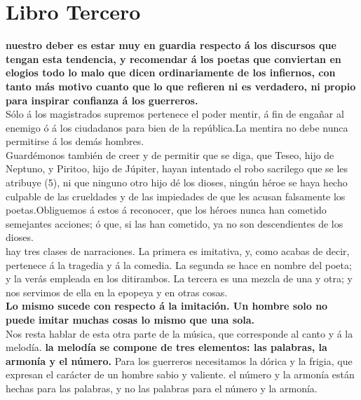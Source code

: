 \documentclass[10pt]{book}
\begin{document}
\chapter*{Libro Tercero}
\textbf{nuestro deber es estar muy en guardia respecto á los discursos que tengan esta tendencia, y recomendar á los poetas que conviertan en elogios todo lo malo que dicen ordinariamente de los infiernos, con tanto más motivo cuanto que lo que refieren ni es verdadero, ni propio para inspirar confianza á los guerreros.}\\
Sólo á los magistrados supremos pertenece el poder mentir, á fin de engañar al enemigo ó á los ciudadanos para bien de la república.La mentira no debe nunca permitirse á los demás hombres.\\
Guardémonos también de creer y de permitir que se diga, que Teseo, hijo de Neptuno, y Piritoo, hijo de Júpiter, hayan intentado el robo sacrilego que se les atribuye (5), ni que ninguno otro hijo dé los dioses, ningún héroe se haya hecho culpable de las crueldades y de las impiedades de que les acusan falsamente los poetas.Obliguemos á estos á reconocer, que los héroes nunca han cometido semejantes acciones; ó que, si las han cometido, ya no son descendientes de los dioses.\\
 hay tres clases de narraciones. La primera es imitativa, y, como acabas de decir, pertenece á la tragedia y á la comedia. La segunda se hace en nombre del poeta; y la verás empleada en los ditirambos. La tercera es una mezcla de una y otra; y nos servimos de ella en la epopeya y en otras cosas.\\
 \textbf{ Lo mismo sucede con respecto á la imitación. Un hombre solo no puede imitar muchas cosas lo mismo que una sola.}\\
Nos resta hablar de esta otra parte de la música, que corresponde al canto y á la melodía. \textbf{la melodía se compone de tres elementos: las palabras, la armonía y el número.} Para los guerreros necesitamos la dórica y la frigia, que expresan el carácter de un hombre sabio y valiente. el número y la armonía están hechas para las palabras, y no las palabras para el número y la armonía. \\\\
\end{document}
